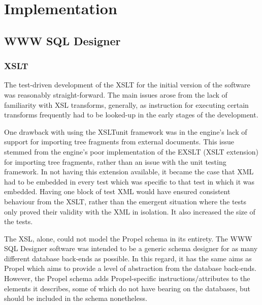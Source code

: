 \cleardoublepage
\chapter{Implementation} %



\section{WWW SQL Designer}
\subsection{XSLT}
The test-driven development of the XSLT for the initial version of the software was reasonably straight-forward. The main issues arose from the lack of familiarity with XSL transforms, generally, as instruction for executing certain transforms frequently had to be looked-up in the early stages of the development.

One drawback with using the XSLTunit framework was in the engine's lack of support for importing tree fragments from external documents. This issue stemmed from the engine's poor implementation of the EXSLT (XSLT extension) for importing tree fragments, rather than an issue with the unit testing framework. In not having this extension available, it became the case that XML had to be embedded in every test which was specific to that test in which it was embedded. Having one block of test XML would have ensured consistent behaviour from the XSLT, rather than the emergent situation where the tests only proved their validity with the XML in isolation. It also increased the size of the tests.

The XSL, alone, could not model the Propel schema in its entirety. The WWW SQL Designer software was intended to be a generic schema designer for as many different database back-ends as possible. In this regard, it has the same aims as Propel which aims to provide a level of abstraction from the database back-ends. However, the Propel schema adds Propel-specific instructions\slash attributes to the elements it describes, some of which do not have bearing on the databases, but should be included in the schema nonetheless.

